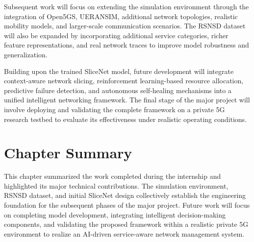 \documentclass[12pt,a4paper]{report}
\begin{document}
	Subsequent work will focus on extending the simulation environment through the integration of Open5GS, UERANSIM, additional network topologies, realistic mobility models, and larger-scale communication scenarios. The RSNSD dataset will also be expanded by incorporating additional service categories, richer feature representations, and real network traces to improve model robustness and generalization.
	
	Building upon the trained SliceNet model, future development will integrate context-aware network slicing, reinforcement learning-based resource allocation, predictive failure detection, and autonomous self-healing mechanisms into a unified intelligent networking framework. The final stage of the major project will involve deploying and validating the complete framework on a private 5G research testbed to evaluate its effectiveness under realistic operating conditions.
	
	\section{Chapter Summary}
	
	This chapter summarized the work completed during the internship and highlighted its major technical contributions. The simulation environment, RSNSD dataset, and initial SliceNet design collectively establish the engineering foundation for the subsequent phases of the major project. Future work will focus on completing model development, integrating intelligent decision-making components, and validating the proposed framework within a realistic private 5G environment to realize an AI-driven service-aware network management system.
	
	
	
	
	
\end{document}
